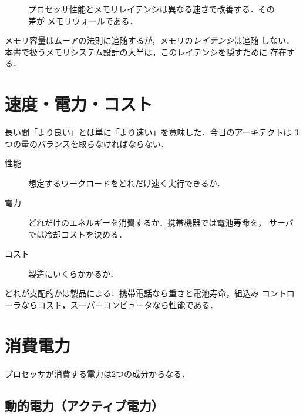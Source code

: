 \documentclass[../main.tex]{subfiles}
\begin{document}
\begin{figure}[htbp]
  \centering
  
  \caption{プロセッサ性能とメモリレイテンシは異なる速さで改善する．その差が
    メモリウォールである．}
  \label{fig:memory-wall}
\end{figure}

\begin{keypoint}
  メモリ容量はムーアの法則に追随するが，メモリの\emph{レイテンシ}は追随
  しない．本書で扱うメモリシステム設計の大半は，このレイテンシを隠すために
  存在する．
\end{keypoint}

\section{速度・電力・コスト}

長い間「より良い」とは単に「より速い」を意味した．今日のアーキテクトは
3つの量のバランスを取らなければならない．
\begin{description}
  \item[性能] 想定するワークロードをどれだけ速く実行できるか．
  \item[電力] どれだけのエネルギーを消費するか．携帯機器では電池寿命を，
    サーバでは冷却コストを決める．
  \item[コスト] 製造にいくらかかるか．
\end{description}
どれが支配的かは製品による．携帯電話なら重さと電池寿命，組込み
コントローラならコスト，スーパーコンピュータなら性能である．

\section{消費電力}

プロセッサが消費する電力は2つの成分からなる．

\subsection{動的電力（アクティブ電力）}
\end{document}
